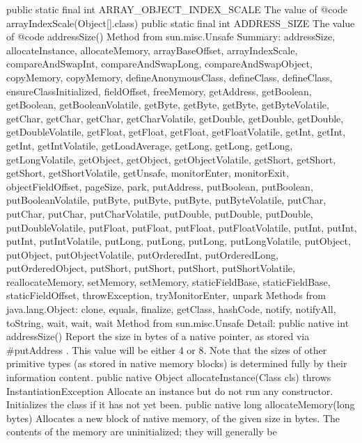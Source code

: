 public static final  int	ARRAY_OBJECT_INDEX_SCALE   	The value of {@code arrayIndexScale(Object[].class)} 
public static final  int	ADDRESS_SIZE   	The value of {@code addressSize()} 
Method from sun.misc.Unsafe Summary:
addressSize,   allocateInstance,   allocateMemory,   arrayBaseOffset,   arrayIndexScale,   compareAndSwapInt,   compareAndSwapLong,   compareAndSwapObject,   copyMemory,   copyMemory,   defineAnonymousClass,   defineClass,   defineClass,   ensureClassInitialized,   fieldOffset,   freeMemory,   getAddress,   getBoolean,   getBoolean,   getBooleanVolatile,   getByte,   getByte,   getByte,   getByteVolatile,   getChar,   getChar,   getChar,   getCharVolatile,   getDouble,   getDouble,   getDouble,   getDoubleVolatile,   getFloat,   getFloat,   getFloat,   getFloatVolatile,   getInt,   getInt,   getInt,   getIntVolatile,   getLoadAverage,   getLong,   getLong,   getLong,   getLongVolatile,   getObject,   getObject,   getObjectVolatile,   getShort,   getShort,   getShort,   getShortVolatile,   getUnsafe,   monitorEnter,   monitorExit,   objectFieldOffset,   pageSize,   park,   putAddress,   putBoolean,   putBoolean,   putBooleanVolatile,   putByte,   putByte,   putByte,   putByteVolatile,   putChar,   putChar,   putChar,   putCharVolatile,   putDouble,   putDouble,   putDouble,   putDoubleVolatile,   putFloat,   putFloat,   putFloat,   putFloatVolatile,   putInt,   putInt,   putInt,   putIntVolatile,   putLong,   putLong,   putLong,   putLongVolatile,   putObject,   putObject,   putObjectVolatile,   putOrderedInt,   putOrderedLong,   putOrderedObject,   putShort,   putShort,   putShort,   putShortVolatile,   reallocateMemory,   setMemory,   setMemory,   staticFieldBase,   staticFieldBase,   staticFieldOffset,   throwException,   tryMonitorEnter,   unpark
Methods from java.lang.Object:
clone,   equals,   finalize,   getClass,   hashCode,   notify,   notifyAll,   toString,   wait,   wait,   wait
Method from sun.misc.Unsafe Detail:
 public native int addressSize()
Report the size in bytes of a native pointer, as stored via #putAddress .  This value will be either 4 or 8.  Note that the sizes of
other primitive types (as stored in native memory blocks) is determined
fully by their information content.
 public native Object allocateInstance(Class cls) throws InstantiationException
Allocate an instance but do not run any constructor.
Initializes the class if it has not yet been.
 public native long allocateMemory(long bytes)
Allocates a new block of native memory, of the given size in bytes.  The
contents of the memory are uninitialized; they will generally be
